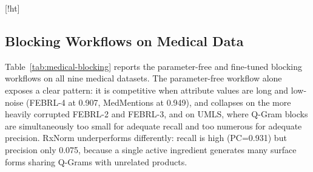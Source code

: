 \documentclass[runningheads]{llncs}
\makeatletter
\renewenvironment{table}
  {\setlength\abovecaptionskip{0\p@}%
   \setlength\belowcaptionskip{7\p@}%
   \@float{table}}
  {\end@float}
\makeatother
\begin{document}
\begin{table}[!ht]
\centering
\caption{kNN-Join reproduction on the ten general-purpose ER datasets, using the base
benchmark's per-dataset configuration. $k$ is per target-collection query entity.}
\label{tab:baseline-knnjoin}
\end{table}

\subsection{Blocking Workflows on Medical Data}
\label{sec:results-blocking}
Table~\ref{tab:medical-blocking} reports the parameter-free and fine-tuned blocking workflows
on all nine medical datasets. The parameter-free workflow alone exposes a clear pattern: it is
competitive when attribute values are long and low-noise (FEBRL-4 at 0.907, MedMentions at
0.949), and collapses on the more heavily corrupted FEBRL-2 and FEBRL-3, and on UMLS, where
Q-Gram blocks are simultaneously too small for adequate recall and too numerous for adequate
precision. RxNorm underperforms differently: recall is high (PC=0.931) but precision only
0.075, because a single active ingredient generates many surface forms sharing Q-Grams with
unrelated products.
\end{document}

